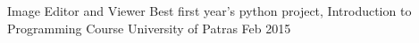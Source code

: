 



\begin{cvhonors}

  \cvhonor
    {Image Editor and Viewer} %
    {Best first year's python project, Introduction to Programming Course} %
    {University of Patras} %
    {Feb 2015} %

\end{cvhonors}
